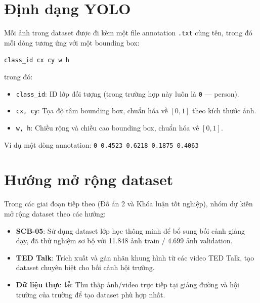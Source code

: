 \section{Định dạng YOLO}
\label{sec:ds_yolo_format}

Mỗi ảnh trong dataset được đi kèm một file annotation \texttt{.txt} cùng tên, trong đó mỗi dòng tương ứng với một bounding box:

\begin{center}
    \texttt{class\_id \quad cx \quad cy \quad w \quad h}
\end{center}

\noindent trong đó:
\begin{itemize}
    \item \texttt{class\_id}: ID lớp đối tượng (trong trường hợp này luôn là \texttt{0} --- person).
    \item \texttt{cx, cy}: Tọa độ tâm bounding box, chuẩn hóa về $[0, 1]$ theo kích thước ảnh.
    \item \texttt{w, h}: Chiều rộng và chiều cao bounding box, chuẩn hóa về $[0, 1]$.
\end{itemize}

Ví dụ một dòng annotation: \texttt{0 0.4523 0.6218 0.1875 0.4063}

\section{Hướng mở rộng dataset}
\label{sec:ds_future}

Trong các giai đoạn tiếp theo (Đồ án 2 và Khóa luận tốt nghiệp), nhóm dự kiến mở rộng dataset theo các hướng:

\begin{itemize}
    \item \textbf{SCB-05}: Sử dụng dataset lớp học thông minh để bổ sung bối cảnh giảng dạy, đã thử nghiệm sơ bộ với 11.848 ảnh train / 4.699 ảnh validation.
    \item \textbf{TED Talk}: Trích xuất và gán nhãn khung hình từ các video TED Talk, tạo dataset chuyên biệt cho bối cảnh hội trường.
    \item \textbf{Dữ liệu thực tế}: Thu thập ảnh/video trực tiếp tại giảng đường và hội trường của trường để tạo dataset phù hợp nhất.
\end{itemize}
